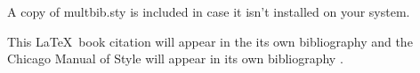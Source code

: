 \documentclass{article}
\begin{document}
A copy of multbib.sty is included in case it isn't installed on your system.

This \LaTeX\ book citation will appear in the its own bibliography  and the Chicago Manual of Style will appear in its own bibliography \cite{chicago}.


\renewcommand{\refname}{Other references}


\end{document}
